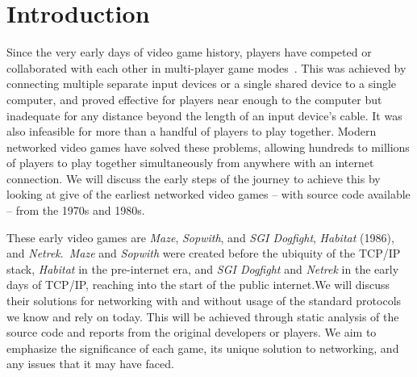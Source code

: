 \section{Introduction}\label{sec:intro}


Since the very early days of video game history, players have competed or collaborated with each other in multi-player game modes~\cite{bnlfirst}. This was achieved by connecting multiple separate input devices or a single shared device to a single computer, and proved effective for players near enough to the computer but inadequate for any distance beyond the length of an input device's cable. It was also infeasible for more than a handful of players to play together. Modern networked video games have solved these problems, allowing hundreds to millions of players to play together simultaneously from anywhere with an internet connection. We will discuss the early steps of the journey to achieve this by looking at give of the earliest networked video games -- with source code available -- from the 1970s and 1980s.

These early video games are \textit{Maze}, \textit{Sopwith}, and \textit{SGI Dogfight}, \textit{Habitat} (1986), and \textit{Netrek}.\ \textit{Maze} and \textit{Sopwith} were created before the ubiquity of the TCP/IP stack, \textit{Habitat} in the pre-internet era, and \textit{SGI Dogfight} and \textit{Netrek} in the early days of TCP/IP, reaching into the start of the public internet.\@ We will discuss their solutions for networking with and without usage of the standard protocols we know and rely on today. This will be achieved through static analysis of the source code and reports from the original developers or players. We aim to emphasize the significance of each game, its unique solution to networking, and any issues that it may have faced.
